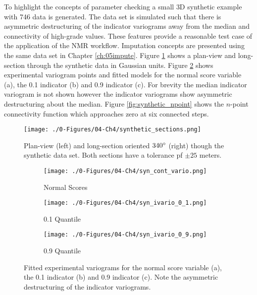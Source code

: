 To highlight the concepts of parameter checking a small \gls{3D} synthetic example with 746 data is generated. The data set is simulated such that there is asymmetric destructuring of the indicator variograms away from the median and connectivity of high-grade values. These features provide a reasonable test case of the application of the \gls{NMR} workflow. Imputation concepts are presented using the same data set in Chapter \ref{ch:05impute}. Figure \ref{fig:synthetic_sections} shows a plan-view and long-section through the synthetic data in Gaussian units. Figure \ref{fig:synthetic_varios} shows experimental variogram points and fitted models for the normal score variable (a), the 0.1 indicator (b) and 0.9 indicator (c). For brevity the median indicator variogram is not shown however the indicator variograms show asymmetric destructuring about the median. Figure \ref{fig:synthetic_npoint} shows the $n$-point connectivity function which approaches zero at six connected steps.

\begin{figure}[htb!]
    \centering
    \texttt{[image: ./0-Figures/04-Ch4/synthetic\_sections.png]}
    \caption{Plan-view (left) and long-section oriented $340\degree$ (right) though the synthetic data set. Both sections have a tolerance pf $\pm25$ meters.}
    \label{fig:synthetic_sections}
\end{figure}

\begin{figure}
    \begin{subfigure}{1.0\textwidth}
        \centering
        \texttt{[image: ./0-Figures/04-Ch4/syn\_cont\_vario.png]}
        \caption{Normal Scores}
    \end{subfigure}
    \begin{subfigure}{1.0\textwidth}
        \centering
        \texttt{[image: ./0-Figures/04-Ch4/syn\_ivario\_0\_1.png]}
        \caption{0.1 Quantile}
    \end{subfigure}
    \begin{subfigure}{1.0\textwidth}
        \centering
        \texttt{[image: ./0-Figures/04-Ch4/syn\_ivario\_0\_9.png]}
        \caption{0.9 Quantile}
    \end{subfigure}
    \caption{Fitted experimental variograms for the normal score variable (a), the 0.1 indicator (b) and 0.9 indicator (c). Note the asymmetric destructuring of the indicator variograms. }
    \label{fig:synthetic_varios}
\end{figure}

